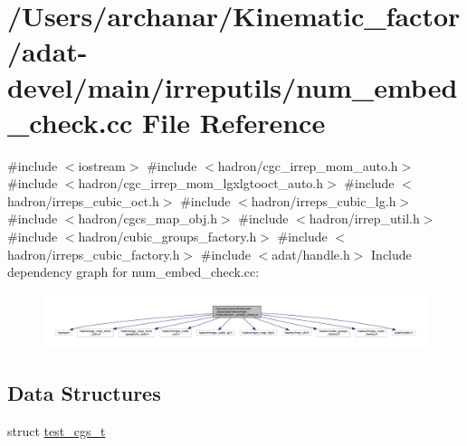 \hypertarget{adat-devel_2main_2irreputils_2num__embed__check_8cc}{}\section{/\+Users/archanar/\+Kinematic\+\_\+factor/adat-\/devel/main/irreputils/num\+\_\+embed\+\_\+check.cc File Reference}
\label{adat-devel_2main_2irreputils_2num__embed__check_8cc}
{\ttfamily \#include $<$iostream$>$}\newline
{\ttfamily \#include $<$hadron/cgc\+\_\+irrep\+\_\+mom\+\_\+auto.\+h$>$}\newline
{\ttfamily \#include $<$hadron/cgc\+\_\+irrep\+\_\+mom\+\_\+lgxlgtooct\+\_\+auto.\+h$>$}\newline
{\ttfamily \#include $<$hadron/irreps\+\_\+cubic\+\_\+oct.\+h$>$}\newline
{\ttfamily \#include $<$hadron/irreps\+\_\+cubic\+\_\+lg.\+h$>$}\newline
{\ttfamily \#include $<$hadron/cgcs\+\_\+map\+\_\+obj.\+h$>$}\newline
{\ttfamily \#include $<$hadron/irrep\+\_\+util.\+h$>$}\newline
{\ttfamily \#include $<$hadron/cubic\+\_\+groups\+\_\+factory.\+h$>$}\newline
{\ttfamily \#include $<$hadron/irreps\+\_\+cubic\+\_\+factory.\+h$>$}\newline
{\ttfamily \#include $<$adat/handle.\+h$>$}\newline
Include dependency graph for num\+\_\+embed\+\_\+check.\+cc\+:
\nopagebreak
\begin{figure}[H]
\begin{center}
\leavevmode
\includegraphics[width=350pt]{d7/d20/adat-devel_2main_2irreputils_2num__embed__check_8cc__incl}
\end{center}
\end{figure}
\subsection*{Data Structures}
\begin{DoxyCompactItemize}
\item 
struct \mbox{\hyperlink{structtest__cgs__t}{test\+\_\+cgs\+\_\+t}}
\end{DoxyCompactItemize}
